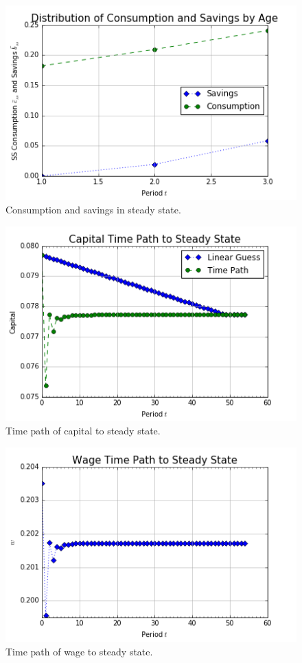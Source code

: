 \documentclass[letterpaper,12pt]{article}
\theoremstyle{definition}
\begin{document}
\begin{figure}[h!]
\centering
\includegraphics[scale=1]{figures/cons_savings_dist}
\caption{Consumption and savings in steady state.}
\end{figure}

\begin{figure}[h!]
\centering
\includegraphics[scale=1]{figures/time_path_K}
\caption{Time path of capital to steady state.}
\end{figure}

\begin{figure}[h!]
\centering
\includegraphics[scale=1]{figures/time_path_w}
\caption{Time path of wage to steady state.}
\end{figure}
\end{document}
